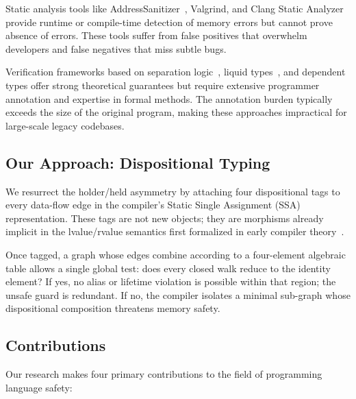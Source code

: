 \documentclass[journal]{IEEEtran}
\begin{document}
Static analysis tools like AddressSanitizer~\cite{serebryany2012addresssanitizer}, Valgrind, and Clang Static Analyzer provide runtime or compile-time detection of memory errors but cannot prove absence of errors. These tools suffer from false positives that overwhelm developers and false negatives that miss subtle bugs.

Verification frameworks based on separation logic~\cite{reynolds2002separation}, liquid types~\cite{rondon2008liquid}, and dependent types offer strong theoretical guarantees but require extensive programmer annotation and expertise in formal methods. The annotation burden typically exceeds the size of the original program, making these approaches impractical for large-scale legacy codebases.

\subsection{Our Approach: Dispositional Typing}

We resurrect the holder/held asymmetry by attaching four dispositional tags to every data-flow edge in the compiler's Static Single Assignment (SSA) representation. These tags are not new objects; they are morphisms already implicit in the lvalue/rvalue semantics first formalized in early compiler theory~\cite{cytron1991efficiently}.

Once tagged, a graph whose edges combine according to a four-element algebraic table allows a single global test: does every closed walk reduce to the identity element? If yes, no alias or lifetime violation is possible within that region; the unsafe guard is redundant. If no, the compiler isolates a minimal sub-graph whose dispositional composition threatens memory safety.

\subsection{Contributions}

Our research makes four primary contributions to the field of programming language safety:
\end{document}
